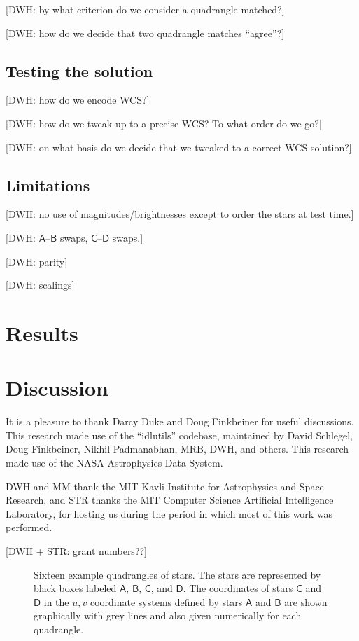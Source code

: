 \documentclass[12pt,preprint]{aastex}
\newcommand{\starlabel}[1]{\mathsf{#1}}
\newcommand{\AAA}{\starlabel{A}}
\newcommand{\BBB}{\starlabel{B}}
\newcommand{\CCC}{\starlabel{C}}
\newcommand{\DDD}{\starlabel{D}}
\begin{document}
[DWH: by what criterion do we consider a quadrangle matched?]

[DWH: how do we decide that two quadrangle matches ``agree''?]

\subsection{Testing the solution}

[DWH: how do we encode WCS?]

[DWH: how do we tweak up to a precise WCS?  To what order do we go?]

[DWH: on what basis do we decide that we tweaked to a correct WCS
  solution?]

\subsection{Limitations}

[DWH: no use of magnitudes/brightnesses except to order the stars at
  test time.]

[DWH: $\AAA$--$\BBB$ swaps, $\CCC$--$\DDD$ swaps.]

[DWH: parity]

[DWH: scalings]

\section{Results}

\section{Discussion}

\acknowledgements
It is a pleasure to thank Darcy Duke and Doug Finkbeiner for useful
discussions.  This research made use of the ``idlutils'' codebase,
maintained by David Schlegel, Doug Finkbeiner, Nikhil Padmanabhan,
MRB, DWH, and others.  This research made use of the NASA Astrophysics
Data System.

DWH and MM thank the MIT Kavli Institute for Astrophysics and Space
Research, and STR thanks the MIT Computer Science Artificial
Intelligence Laboratory, for hosting us during the period in which
most of this work was performed.

[DWH + STR: grant numbers??]




\clearpage
\begin{figure}
\caption{Sixteen example quadrangles of stars.  The stars are
  represented by black boxes labeled $\AAA$, $\BBB$, $\CCC$, and
  $\DDD$.  The coordinates of stars $\CCC$ and $\DDD$ in the $u,v$
  coordinate systems defined by stars $\AAA$ and $\BBB$ are shown
  graphically with grey lines and also given numerically for each
  quadrangle.\label{fig:quad}}
\end{figure}
\end{document}
